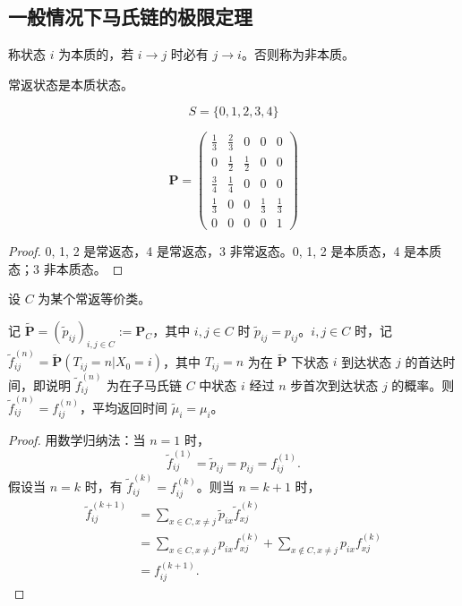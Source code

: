 \documentclass[lang=cn,10pt,thmcnt=section]{elegantbook}
\begin{document}
\subsection{一般情况下马氏链的极限定理}
\begin{definition}[本质状态]
	称状态 \( i \) 为本质的，若 \( i \to j \) 时必有 \( j \to i \)。否则称为非本质。
\end{definition}
\begin{theorem}
	常返状态是本质状态。
\end{theorem}
\begin{example}
	\begin{equation*}
		S = \{0, 1, 2, 3, 4\}
		\end{equation*}
		
		\[
		\mathbf{P} = \left(
		\begin{array}{ccccc}
		\frac{1}{3} & \frac{2}{3} & 0 & 0 & 0 \\
		0 & \frac{1}{2} & \frac{1}{2} & 0 & 0 \\
		\frac{3}{4} & \frac{1}{4} & 0 & 0 & 0 \\
		\frac{1}{3} & 0 & 0 & \frac{1}{3} & \frac{1}{3} \\
		0 & 0 & 0 & 0 & 1
		\end{array}
		\right)
		\]
		
	
\end{example}
\begin{proof}
	0, 1, 2 是常返态，4 是常返态，3 非常返态。0, 1, 2 是本质态，4 是本质态；3 非本质态。
\end{proof}
\begin{lemma}
	设 \( C \) 为某个常返等价类。

记 \(\widetilde{\mathbf{P}} = (\widetilde{p}_{ij})_{i,j \in C} := \mathbf{P}_C\)，其中 \(i,j \in C\) 时 \(\widetilde{p}_{ij} = p_{ij}\)。\(i, j \in C\) 时，记 \(\widetilde{f}_{ij}^{(n)} = \widetilde{\mathbf{P}}(T_{ij} = n | X_0 = i)\)，其中 \(T_{ij} = n\) 为在 \(\widetilde{\mathbf{P}}\) 下状态 \(i\) 到达状态 \(j\) 的首达时间，即说明 \(\widetilde{f}_{ij}^{(n)}\) 为在子马氏链 \(C\) 中状态 \(i\) 经过 \(n\) 步首次到达状态 \(j\) 的概率。则 \(\widetilde{f}_{ij}^{(n)} = f_{ij}^{(n)}\)，平均返回时间 \(\widetilde{\mu}_i = \mu_i\)。
\end{lemma}
\begin{proof}
	用数学归纳法：当 \(n = 1\) 时，
\[
\widetilde{f}_{ij}^{(1)} = \widetilde{p}_{ij} = p_{ij} = f_{ij}^{(1)}.
\]
假设当 \(n = k\) 时，有 \(\widetilde{f}_{ij}^{(k)} = f_{ij}^{(k)}\)。则当 \(n = k + 1\) 时，
\begin{align*}
\widetilde{f}_{ij}^{(k+1)} &= \sum_{x \in C, x \neq j} \widetilde{p}_{ix} \widetilde{f}_{xj}^{(k)} \\
&= \sum_{x \in C, x \neq j} p_{ix} f_{xj}^{(k)} + \sum_{x \notin C, x \neq j} p_{ix} f_{xj}^{(k)} \\
&= f_{ij}^{(k+1)}.
\end{align*}

\end{proof}
\end{document}
